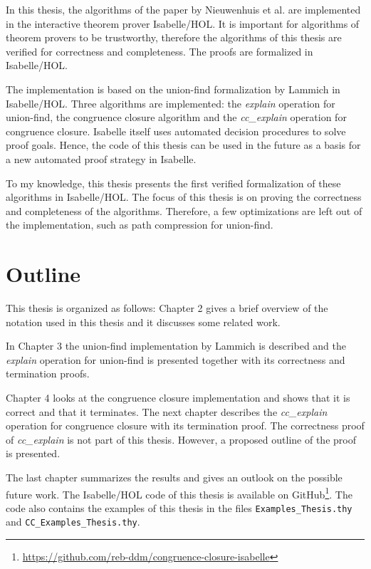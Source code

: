 In this thesis, the algorithms of the paper by Nieuwenhuis et al. \cite{Nieuwenhuis} are implemented in the interactive theorem prover Isabelle/HOL.
It is important for algorithms of theorem provers to be trustworthy, therefore the algorithms of this thesis are verified for correctness and completeness.
The proofs are formalized in Isabelle/HOL.

The implementation is based on the union-find formalization by Lammich \cite{unionfind-isabelle} in Isabelle/HOL. Three algorithms are implemented: the \emph{explain} operation for union-find, the congruence closure algorithm and the \emph{cc\_explain} operation for congruence closure.
Isabelle itself uses automated decision procedures to solve proof goals.
Hence, the code of this thesis can be used in the future as a basis for a new automated proof strategy in Isabelle.

To my knowledge, this thesis presents the first verified formalization of these algorithms in Isabelle/HOL.
The focus of this thesis is on proving the correctness and completeness of the algorithms.
Therefore, a few optimizations are left out of the implementation, such as path compression for union-find.

\section{Outline}
This thesis is organized as follows: Chapter 2 gives a brief overview of the notation used in this thesis and it discusses some related work.

In Chapter 3 the union-find implementation by Lammich \cite{unionfind-isabelle} is described and the \emph{explain} operation for union-find is presented together with its correctness and termination proofs.

Chapter 4 looks at the congruence closure implementation and shows that it is correct and that it terminates. The next chapter describes the \emph{cc\_explain} operation for congruence closure with its termination proof. The correctness proof of \emph{cc\_explain} is not part of this thesis. However, a proposed outline of the proof is presented.

The last chapter summarizes the results and gives an outlook on the possible future work.
The Isabelle/HOL code of this thesis is available on GitHub\footnote{\url{https://github.com/reb-ddm/congruence-closure-isabelle}}.
The code also contains the examples of this thesis in the files \lstinline|Examples_Thesis.thy| and \lstinline|CC_Examples_Thesis.thy|.

